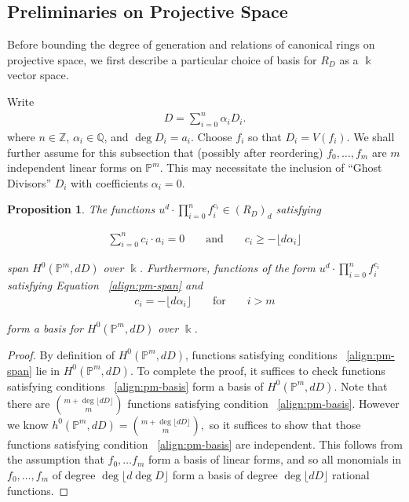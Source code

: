 \documentclass{amsart}
\theoremstyle{plain}
\newtheorem{prop}[thm]{Proposition}
\theoremstyle{definition}
\theoremstyle{remark}
\numberwithin{equation}{section}
\newcommand\ssec{\subsection}
\newcommand\bq{{\mathbb Q}}
\newcommand\bp{{\mathbb P}}
\newcommand\bz{{\mathbb Z}}
\newcommand\bk{{\Bbbk}}
\newcommand\bida{a}
\begin{document}
\ssec{Preliminaries on Projective Space}
Before bounding the degree of generation and relations of
canonical rings on projective space, we first
describe a particular choice of basis for $R_D$ as a $\bk$ vector
space.

Write \begin{align*}
	D = \sum_{i=0}^{n}\alpha_i D_i.
\end{align*}
where $n \in \bz$, $\alpha_i \in \bq$, and $\deg D_i = \bida_i$. 
Choose $f_i$ so that $D_i = V(f_i)$.
We shall further assume for this subsection that (possibly after
reordering) $f_0,\ldots, f_{m}$ are $m$ independent linear forms
on $\bp^m$.  This may necessitate the inclusion of ``Ghost Divisors'' $D_i$ with coefficients $\alpha_i = 0$. 

\begin{prop}
\label{prop:pm-span-and-basis}
The functions $u^d \cdot \prod_{i=0}^n f_i^{c_i} \in (R_D)_d$ satisfying

\begin{align}
\label{align:pm-span}
\sum_{i=0}^{n} c_i \cdot \bida_i = 0 && \text{ and } &&c_i \geq
-\lfloor d\alpha_i \rfloor	
\end{align}

\noindent
span $H^0(\bp^m, dD)$ over $\bk$. Furthermore, functions 
of the form $u^d \cdot \prod_{i=0}^n f_i^{c_i}$ satisfying Equation ~\eqref{align:pm-span} and
\begin{align}
\label{align:pm-basis}
c_i = -\lfloor d\alpha_i \rfloor && \text{ for } && i > m
\end{align}

\noindent
form a basis for $H^0(\bp^m, dD)$ over $\bk$.
\end{prop}

\begin{proof}
By definition of $H^0(\bp^m,dD)$, functions satisfying conditions 
~\eqref{align:pm-span} lie in $H^0(\mathbb{P}^m,dD)$.
To complete the proof, it
suffices to check functions satisfying conditions ~\eqref{align:pm-basis} form
a basis of $H^0(\bp^m,dD)$. Note that there are $\binom{m+ \deg \lfloor dD \rfloor }{m}$
functions satisfying condition ~\eqref{align:pm-basis}. However we know
$h^0(\bp^m,dD) = \binom{m+ \deg \lfloor dD \rfloor }{m},$ so it suffices to show
that those functions satisfying condition ~\eqref{align:pm-basis} are
independent. This follows from the assumption that $f_0,\ldots f_m$ form a
basis of linear forms, and so all monomials in $f_0,\ldots, f_m$
of degree $\deg \lfloor d \deg D \rfloor $
form a basis of degree $\deg \lfloor d  D \rfloor$ rational functions.
\end{proof}
\end{document}
